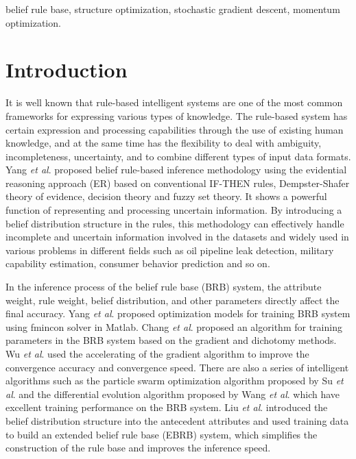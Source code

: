 \documentclass{ieeeaccess}
\begin{document}
\begin{keywords}
    belief rule base, structure optimization, stochastic gradient descent, momentum optimization.
\end{keywords}

\titlepgskip=-15pt

\maketitle

\section{Introduction}
\label{sec:introduction}

It is well known that rule-based intelligent systems are one of the most common frameworks for expressing various types of knowledge.
The rule-based system has certain expression and processing capabilities through the use of existing human knowledge,
and at the same time has the flexibility to deal with ambiguity, incompleteness, uncertainty, and to combine different types of input data formats.
Yang \textit{et al}.\cite{a1} proposed belief rule-based inference methodology using the evidential reasoning approach (ER)
based on conventional IF-THEN rules\cite{a2}, Dempster-Shafer theory of evidence\cite{a3,a4}, decision theory\cite{a5}
and fuzzy set theory\cite{a6}. It shows a powerful function of representing and processing uncertain information.
By introducing a belief distribution structure in the rules,
this methodology can effectively handle incomplete and uncertain information involved in the datasets and
widely used in various problems in different fields such as
oil pipeline leak detection\cite{a7}, military capability estimation\cite{a8}, consumer behavior prediction\cite{a9} and so on.

In the inference process of the belief rule base (BRB) system, the attribute weight, rule weight, belief distribution, and other parameters
directly affect the final accuracy. Yang \textit{et al}.\cite{a10} proposed optimization models for training BRB system using fmincon solver in
Matlab. Chang \textit{et al}.\cite{a11,a12} proposed an algorithm for training parameters in the BRB system based on the gradient and dichotomy methods.
Wu \textit{et al}.\cite{a13} used the accelerating of the gradient algorithm to improve the convergence accuracy and convergence speed.
There are also a series of intelligent algorithms such as the particle swarm optimization algorithm proposed by Su \textit{et al}.\cite{a14} and the differential evolution
algorithm proposed by Wang \textit{et al}.\cite{a15} which have excellent training performance on the BRB system.
Liu \textit{et al}.\cite{a16} introduced the belief distribution structure into the antecedent attributes and
used training data to build an extended belief rule base (EBRB) system,
which simplifies the construction of the rule base and improves the inference speed.
\end{document}

